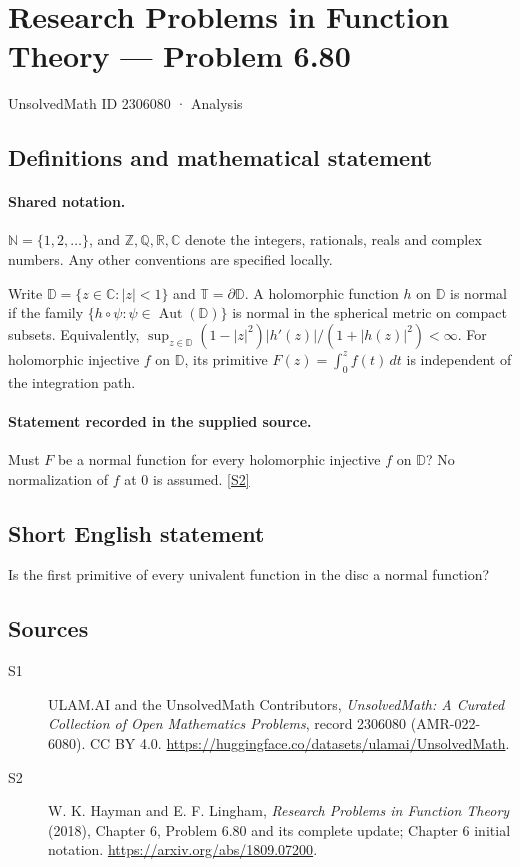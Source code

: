\documentclass[11pt]{article}
\newcommand{\sref}[2]{\hyperlink{source:#1:#2}{[S#2]}}
\begin{document}
\setcounter{section}{2306079}
\section{Research Problems in Function Theory — Problem 6.80}\label{2306080}
{\small\sffamily UnsolvedMath ID 2306080 · Analysis}
\subsection{Definitions and mathematical statement}

\paragraph{Shared notation.}$\mathbb N=\{1,2,\ldots\}$, and $\mathbb Z,\mathbb Q,\mathbb R,\mathbb C$ denote the integers, rationals, reals and complex numbers. Any other conventions are specified locally.


Write $\mathbb D=\{z\in\mathbb C:|z|<1\}$ and $\mathbb T=\partial\mathbb D$. A holomorphic function $h$ on $\mathbb D$ is normal if the family $\{h\circ\psi:\psi\in\operatorname{Aut}(\mathbb D)\}$ is normal in the spherical metric on compact subsets. Equivalently, $\sup_{z\in\mathbb D}(1-|z|^2)|h'(z)|/(1+|h(z)|^2)<\infty$. For holomorphic injective $f$ on $\mathbb D$, its primitive $F(z)=\int_0^z f(t)\,dt$ is independent of the integration path.
\paragraph{Statement recorded in the supplied source.}
Must $F$ be a normal function for every holomorphic injective $f$ on $\mathbb D$? No normalization of $f$ at $0$ is assumed. \sref{2306080}{2}
\subsection{Short English statement}
Is the first primitive of every univalent function in the disc a normal function?
\subsection{Sources}
\begin{description}
\item[\hypertarget{source:2306080:1}{S1}] ULAM.AI and the UnsolvedMath Contributors, \emph{UnsolvedMath: A Curated Collection of Open Mathematics Problems}, record 2306080 (AMR-022-6080). CC BY 4.0. \url{https://huggingface.co/datasets/ulamai/UnsolvedMath}.
\item[\hypertarget{source:2306080:2}{S2}] W. K. Hayman and E. F. Lingham, \emph{Research Problems in Function Theory} (2018), Chapter 6, Problem 6.80 and its complete update; Chapter 6 initial notation. \url{https://arxiv.org/abs/1809.07200}.
\end{description}
\label{end:2306080}
\end{document}
